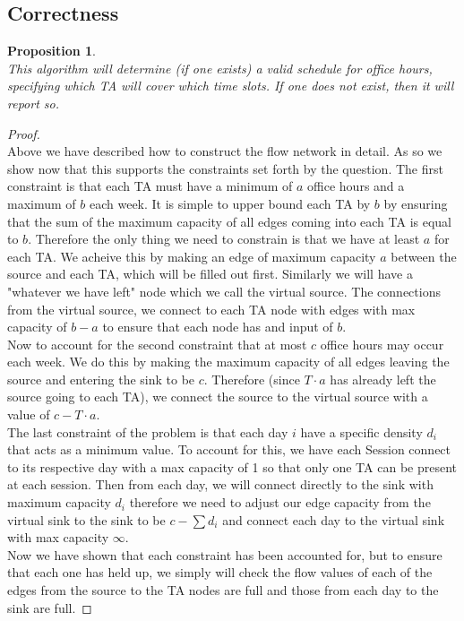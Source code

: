 \documentclass[12pt]{article}
\newtheorem{proposition}[theorem]{Proposition}
\begin{document}
\subsection{Correctness}
\begin{proposition}
~ \\ \indent This algorithm will determine (if one exists) a valid schedule for office hours,
specifying which TA will cover which time slots. If one does not exist, then it will report so.
\end{proposition}

\begin{proof}
~ \\ \indent Above we have described how to construct the flow network in detail. As so we
show now that this supports the constraints set forth by the question. The first constraint
is that each TA must have a minimum of $a$ office hours and a maximum of $b$ each week. It is
simple to upper bound each TA by $b$ by ensuring that the sum of the maximum capacity of all
edges coming into each TA is equal to $b$. Therefore the only thing we need to constrain is
that we have at least $a$ for each TA. We acheive this by making an edge of maximum capacity
$a$ between the source and each TA, which will be filled out first. Similarly we will have a
"whatever we have left" node which we call the virtual source. The connections from the
virtual source, we connect to each TA node with edges with max capacity of $b-a$ to ensure
that each node has and input of $b$. \\
\indent Now to account for the second constraint that at most $c$ office hours may occur each
week. We do this by making the maximum capacity of all edges leaving the source and entering
the sink to be $c$. Therefore (since $T\cdot a$ has already left the source going to each TA),
we connect the source to the virtual source with a value of $c - T\cdot a$. \\
\indent The last constraint of the problem is that each day $i$ have a specific density $d_i$
that acts as a minimum value. To account for this, we have each Session connect to its
respective day with a max capacity of 1 so that only one TA can be present at each session.
Then from each day, we will connect directly to the sink with maximum capacity $d_i$ therefore
we need to adjust our edge capacity from the virtual sink to the sink to be $c - \sum d_i$ and
connect each day to the virtual sink with max capacity $\infty$. \\
\indent Now we have shown that each constraint has been accounted for, but to ensure that each
one has held up, we simply will check the flow values of each of the edges from the source to
the TA nodes are full and those from each day to the sink are full.
\end{proof}
\end{document}
